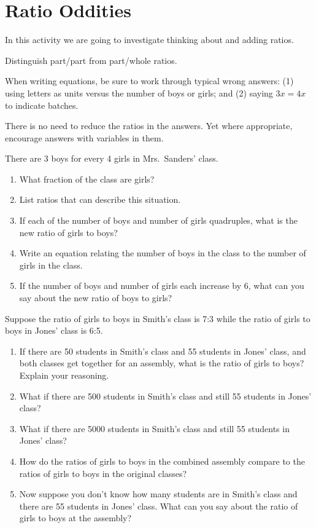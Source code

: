 \newpage
\section{Ratio Oddities}\label{A:ratioOddities}
In this activity we are going to investigate thinking about and adding
ratios.

\begin{teachingnote}
Distinguish part/part from part/whole ratios.  

When writing equations, be sure to work through typical wrong answers:  (1) using letters as units versus the number of boys or girls; and (2) saying $3x=4x$ to indicate batches.  

There is no need to reduce the ratios in the answers.  Yet where appropriate, encourage answers with variables in them.

\end{teachingnote}

\begin{prob}
There are 3 boys for every 4 girls in Mrs.\ Sanders' class.
\begin{enumerate}
\item What fraction of the class are girls? 
\item List ratios that can describe this situation. 
\item If each of the number of boys and number of girls quadruples, what is the new ratio of girls to boys?
\item Write an equation relating the number of boys in the class to the number of girls in the class.

\item If the number of boys and number of girls each increase by 6, what can you say about the new ratio of boys to girls?
\end{enumerate}
\end{prob}



\begin{prob}\label{AP:C1}
Suppose the ratio of girls to boys in Smith's class is 7:3 while the
ratio of girls to boys in Jones' class is 6:5.  
\begin{enumerate}
\item If there are 50 students in Smith's class and 55 students in Jones' class, and both
classes get together for an assembly, what is the ratio of girls to
boys? Explain your reasoning.
\item What if there are 500 students in Smith's class and still 55 students in Jones' class?  
\item What if there are 5000 students in Smith's class and still 55 students in Jones' class?  
\item How do the ratios of girls to boys in the combined assembly compare to the ratios of girls to boys in the original classes?  
\item Now suppose you don't know how many students are in Smith's class and there are 55 students in Jones' class. What can you say about the ratio of girls to boys at the assembly?
\end{enumerate}
\end{prob}

